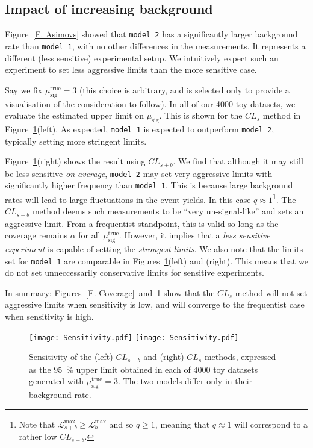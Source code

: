\subsection{Impact of increasing background}
\label{S. CLsInAction::ConfidenceLevels}

Figure~\ref{F. Asimovs} showed that \texttt{model 2} has a significantly larger background rate than \texttt{model 1}, with no other differences in the measurements. It represents a different (less sensitive) experimental setup. We intuitively expect such an experiment to set less aggressive limits than the more sensitive case.

Say we fix $\mu_\text{sig}^\text{true}=3$ (this choice is arbitrary, and is selected only to provide a visualisation of the consideration to follow). In all of our 4000 toy datasets, we evaluate the estimated upper limit on $\mu_\text{sig}$. This is shown for the $CL_s$ method in Figure~\ref{F. Sensitivity}(left). As expected, \texttt{model 1} is expected to outperform \texttt{model 2}, typically setting more stringent limits.

Figure~\ref{F. Sensitivity}(right) shows the result using $CL_{s+b}$. We find that although it may still be less sensitive \textit{on average}, \texttt{model 2} may set very aggressive limits with significantly higher frequency than \texttt{model 1}. This is because large background rates will lead to large fluctuations in the event yields. In this case $q\approx1$\footnote{Note that $\mathcal{L}^\text{max}_{s+b}\geq\mathcal{L}^\text{max}_{b}$ and so $q\geq1$, meaning that $q\approx1$ will correspond to a rather low $CL_{s+b}$.}. The $CL_{s+b}$ method deems such measurements to be ``very un-signal-like'' and sets an aggressive limit. From a frequentist standpoint, this is valid so long as the coverage remains $\alpha$ for all $\mu_\text{sig}^\text{true}$. However, it implies that a \textit{less sensitive experiment} is capable of setting the \textit{strongest limits}. We also note that the limits set for \texttt{model 1} are comparable in Figures~\ref{F. Sensitivity}(left) and (right). This means that we do not set unneccessarily conservative limits for sensitive experiments.

In summary: Figures~\ref{F. Coverage}~and~\ref{F. Sensitivity} show that the $CL_s$ method will not set aggressive limits when sensitivity is low, and will converge to the frequentist case when sensitivity is high. 




\begin{figure}[t!]
\centering
\texttt{[image: Sensitivity.pdf]}
\texttt{[image: Sensitivity.pdf]}
\caption{Sensitivity of the (left) $CL_{s+b}$ and (right) $CL_s$ methods, expressed as the 95~\% upper limit obtained in each of 4000 toy datasets generated with $\mu_\text{sig}^\text{true}=3$. The two models differ only in their background rate.}
\label{F. Sensitivity}
\end{figure}





%
%
%

